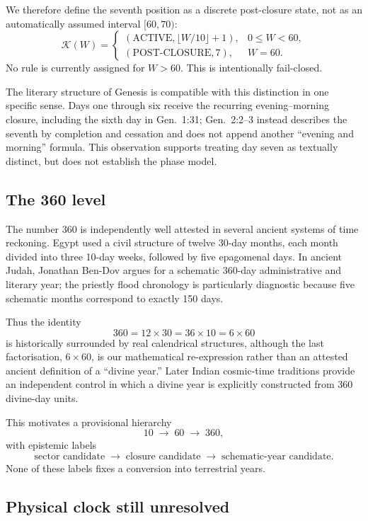 We therefore define the seventh position as a discrete post-closure state,
not as an automatically assumed interval $[60,70)$:
\[
\mathcal K(W)=
\begin{cases}
(\mathrm{ACTIVE},\lfloor W/10\rfloor+1), & 0\le W<60,\\
(\mathrm{POST\mbox{-}CLOSURE},7), & W=60.
\end{cases}
\]
No rule is currently assigned for $W>60$.  This is intentionally fail-closed.

The literary structure of Genesis is compatible with this distinction in one
specific sense.  Days one through six receive the recurring evening--morning
closure, including the sixth day in Gen.~1:31; Gen.~2:2--3 instead describes
the seventh by completion and cessation and does not append another
``evening and morning'' formula.  This observation supports treating day seven
as textually distinct, but does not establish the phase model.

\subsection{The 360 level}

The number 360 is independently well attested in several ancient systems of
time reckoning.  Egypt used a civil structure of twelve 30-day months, each
month divided into three 10-day weeks, followed by five epagomenal days.  In
ancient Judah, Jonathan Ben-Dov argues for a schematic 360-day administrative
and literary year; the priestly flood chronology is particularly diagnostic
because five schematic months correspond to exactly 150 days.

Thus the identity
\[
360=12\times30=36\times10=6\times60
\]
is historically surrounded by real calendrical structures, although the last
factorisation, $6\times60$, is our mathematical re-expression rather than an
attested ancient definition of a ``divine year.''  Later Indian cosmic-time
traditions provide an independent control in which a divine year is explicitly
constructed from 360 divine-day units.

This motivates a provisional hierarchy
\[
10\;\longrightarrow\;60\;\longrightarrow\;360,
\]
with epistemic labels
\[
\text{sector candidate}\;\longrightarrow\;
\text{closure candidate}\;\longrightarrow\;
\text{schematic-year candidate}.
\]
None of these labels fixes a conversion into terrestrial years.

\subsection{Physical clock still unresolved}

